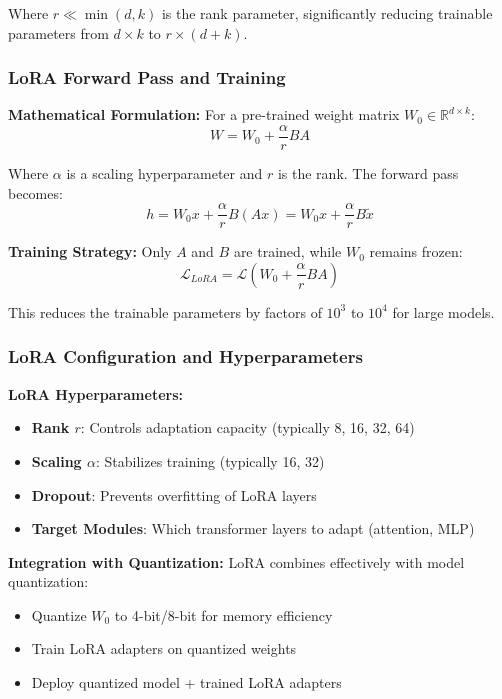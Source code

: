 \documentclass[conference]{IEEEtran}
\begin{document}
Where $r \ll \min(d, k)$ is the rank parameter, significantly reducing trainable parameters from $d \times k$ to $r \times (d + k)$.

\subsubsection{LoRA Forward Pass and Training}
\label{sec:q3_lora_forward}

\textbf{Mathematical Formulation:}
For a pre-trained weight matrix $W_0 \in \mathbb{R}^{d \times k}$:
\begin{equation}
W = W_0 + \frac{\alpha}{r} B A
\end{equation}

Where $\alpha$ is a scaling hyperparameter and $r$ is the rank. The forward pass becomes:
\begin{equation}
h = W_0 x + \frac{\alpha}{r} B (A x) = W_0 x + \frac{\alpha}{r} B \tilde{x}
\end{equation}

\textbf{Training Strategy:}
Only $A$ and $B$ are trained, while $W_0$ remains frozen:
\begin{equation}
\mathcal{L}_{LoRA} = \mathcal{L}(W_0 + \frac{\alpha}{r} B A)
\end{equation}

This reduces the trainable parameters by factors of $10^3$ to $10^4$ for large models.

\subsubsection{LoRA Configuration and Hyperparameters}
\label{sec:q3_lora_config}

\textbf{LoRA Hyperparameters:}
\begin{itemize}
  \item \textbf{Rank $r$}: Controls adaptation capacity (typically 8, 16, 32, 64)
  \item \textbf{Scaling $\alpha$}: Stabilizes training (typically 16, 32)
  \item \textbf{Dropout}: Prevents overfitting of LoRA layers
  \item \textbf{Target Modules}: Which transformer layers to adapt (attention, MLP)
\end{itemize}

\textbf{Integration with Quantization:}
LoRA combines effectively with model quantization:
\begin{itemize}
  \item Quantize $W_0$ to 4-bit/8-bit for memory efficiency
  \item Train LoRA adapters on quantized weights
  \item Deploy quantized model + trained LoRA adapters
\end{itemize}
\end{document}
